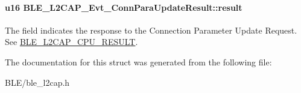 \paragraph[{\texorpdfstring{result}{result}}]{\setlength{\rightskip}{0pt plus 5cm}u16 B\+L\+E\+\_\+\+L2\+C\+A\+P\+\_\+\+Evt\+\_\+\+Conn\+Para\+Update\+Result\+::result}\hypertarget{struct_b_l_e___l2_c_a_p___evt___conn_para_update_result_a7151204dcf13ee49166b828e59ce1779}{}\label{struct_b_l_e___l2_c_a_p___evt___conn_para_update_result_a7151204dcf13ee49166b828e59ce1779}
The field indicates the response to the Connection Parameter Update Request. See \hyperlink{group___b_l_e___l2_c_a_p___c_p_u___r_e_s_u_l_t}{B\+L\+E\+\_\+\+L2\+C\+A\+P\+\_\+\+C\+P\+U\+\_\+\+R\+E\+S\+U\+LT}. 

The documentation for this struct was generated from the following file\+:\begin{DoxyCompactItemize}
\item 
B\+L\+E/ble\+\_\+l2cap.\+h\end{DoxyCompactItemize}
